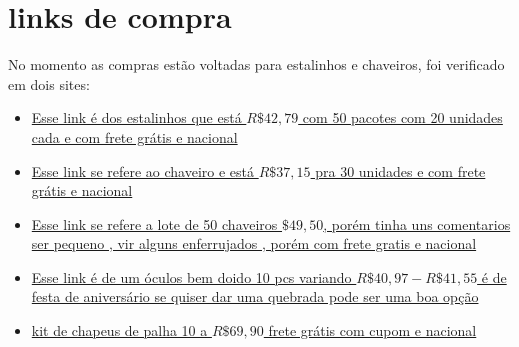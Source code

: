 \documentclass{article}
\begin{document}
\section{links de compra}
No momento as compras estão voltadas para estalinhos e chaveiros, foi verificado em dois sites:\\
\begin{itemize}
\item \href{https://shopee.com.br/product/288720899/23492981314?d_id=de29b&uls_trackid=4vqqhlti00s6&utm_content=XrQoHsUQGSDgE7RsV4bsCbodNM5}{Esse link é dos estalinhos que está $R\$ 42,79$ com 50 pacotes com 20 unidades cada e com frete grátis e nacional}\\

\item \href{https://shopee.com.br/product/344441852/21112157396?d_id=de29b&uls_trackid=4vqqi7k500s6&utm_content=XrQoHsUQGMtU7MZszD8guRezs27}{Esse link se refere ao chaveiro e está $R\$37,15$ pra 30 unidades e com frete grátis e nacional}\\

\item  \href{https://shopee.com.br/Kit-Chaveiros-Variados-50-Unidade-Diferentes-Atacado-Lembrancinha-Festinha-Festa-i.344441852.19199231318?publish_id=&sp_atk=b8e96dd3-3b2e-4106-9448-b3cc9638229c&xptdk=b8e96dd3-3b2e-4106-9448-b3cc9638229c}{Esse link se refere a lote de 50 chaveiros $ \$49, 50$, porém tinha uns comentarios ser pequeno , vir alguns enferrujados , porém com frete gratis e nacional}
\item \href{https://shopee.com.br/10pcs-%C3%93culos-De-Sol-Para-Festas-Engra%C3%A7ados-De-Anivers%C3%A1rio-Decora%C3%A7%C3%A3o-De-Fantasias-Adere%C3%A7os-i.1006215031.25224108938?publish_id=&sp_atk=186491a2-4cd0-4711-a6b9-e0406eacc622&xptdk=186491a2-4cd0-4711-a6b9-e0406eacc622}{ Esse link é de um óculos bem doido 10 pcs variando $R\$40, 97 - R\$41,55$ é de festa de aniversário se quiser dar uma quebrada pode ser uma boa opção}

\item \href{https://shopee.com.br/Kit-10-Chap%C3%A9us-de-Palha-Fof%C3%A3o-guri-Festa-Junina-Decora%C3%A7%C3%A3o-S%C3%A3o-Jo%C3%A3o-i.514351259.23197483000?sp_atk=ce84203b-b002-4e6e-8413-a413837b1c28&xptdk=ce84203b-b002-4e6e-8413-a413837b1c28}{kit de chapeus de palha 10 a $R\$69, 90$ frete grátis com cupom e nacional}
\end{itemize}
\end{document}
